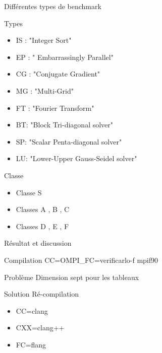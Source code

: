\documentclass{beamer}
\begin{document}
\begin{frame}{ Différentes types de benchmark}

  \begin{block}{Types}
    \begin{itemize}
    \item IS : "Integer Sort"
    \item EP : " Embarrassingly Parallel"
    \item CG : "Conjugate Gradient" 
    \item MG : "Multi-Grid"
    \item FT : "Fourier Transform"
    \item BT: "Block Tri-diagonal solver"
    \item SP: "Scalar Penta-diagonal solver"
    \item LU: "Lower-Upper Gauss-Seidel solver"
    \end{itemize}
  \end{block}
  
  \begin{block}{Classe}
    \begin{itemize}
    \item Classe S 
    \item  Classes A , B , C 
    \item Classes D , E , F
    \end{itemize}
  \end{block}
  
\end{frame}

\begin{frame}{ Résultat et discussion}

  \begin{block}{Compilation}
    CC=OMPI\_FC=verificarlo-f  mpif90
  \end{block}
  
  \begin{block}{Problème}
    Dimension sept pour les tableaux
  \end{block}
  
  \begin{block}{Solution}
    Ré-compilation
    \begin{itemize}
    \item CC=clang
    \item CXX=clang++
    \item FC=flang
    \end{itemize}
  \end{block}

\end{frame}
\end{document}
